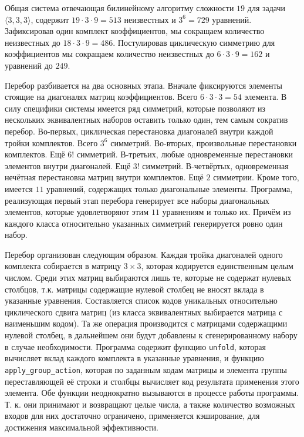 \documentclass[12pt]{article}
\begin{document}
Общая система отвечающая билинейному алгоритму сложности $19$ для задачи $\langle 3, 3, 3 \rangle$,
содержит $19 \cdot 3 \cdot 9 = 513$ неизвестных и $3^6 = 729$ уравнений. Зафиксировав один комплект коэффициентов, мы сокращаем количество неизвестных до $18 \cdot 3 \cdot 9 = 486$. Постулировав циклическую симметрию для коэффициентов мы сокращаем количество неизвестных до $6 \cdot 3 \cdot 9 = 162$ и уравнений до $249$.

Перебор разбивается на два основных этапа. Вначале фиксируются элементы стоящие на диагоналях матриц коэффициентов. Всего $6 \cdot 3 \cdot 3 = 54$ элемента. В силу специфики системы имеется ряд симметрий, которые позволяют из нескольких эквивалентных наборов оставить только один, тем самым сократив перебор. Во-первых, циклическая перестановка диагоналей внутри каждой тройки комплектов. Всего $3^6$ симметрий. Во-вторых, произвольные перестановки комплектов. Ещё $6!$ симметрий. В-третьих, любые одновременные перестановки элементов внутри диагоналей. Ещё $3!$ симметрий. В-четвёртых, одновременная нечётная перестановка матриц внутри комплектов. Ещё $2$ симметрии. Кроме того, имеется $11$ уравнений, содержащих только диагональные элементы. Программа, реализующая первый этап перебора генерирует все наборы диагональных элементов, которые удовлетворяют этим $11$ уравнениям и только их. Причём из каждого класса относительно указанных симметрий генерируется ровно один набор.

Перебор организован следующим образом. Каждая тройка диагоналей одного комплекта собирается в матрицу $3 \times 3$, которая кодируется единственным целым числом. Среди этих матриц выбираются лишь те, которые не содержат нулевых столбцов, т.к. матрицы содержащие нулевой столбец не вносят вклада в указанные уравнения. Составляется список кодов уникальных относительно циклического сдвига матриц (из класса эквивалентных выбирается матрица с наименьшим кодом). Та же операция производится с матрицами содержащими нулевой столбец, в дальнейшем они будут добавлены к сгенерированному набору в случае необходимости. Программа содержит функцию \texttt{unfold}, которая вычисляет вклад каждого комплекта в указанные уравнения, и функцию \texttt{apply\_group\_action}, которая по заданным кодам матрицы и элемента группы переставляющей её строки и столбцы вычисляет код результата применения этого элемента. Обе функции неоднократно вызываются в процессе работы программы. Т. к. они принимают и возвращают целые числа, а также количество возможных входов для них достаточно ограничено, применяется кэширование, для достижения максимальной эффективности.
\end{document}
